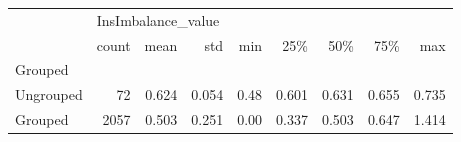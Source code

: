 \begin{tabular}{lrrrrrrrr}
\toprule
{} & \multicolumn{8}{l}{InsImbalance\_value} \\
{} &              count &   mean &    std &   min &    25\% &    50\% &    75\% &    max \\
Grouped   &                    &        &        &       &        &        &        &        \\
\midrule
Ungrouped &                 72 &  0.624 &  0.054 &  0.48 &  0.601 &  0.631 &  0.655 &  0.735 \\
Grouped   &               2057 &  0.503 &  0.251 &  0.00 &  0.337 &  0.503 &  0.647 &  1.414 \\
\bottomrule
\end{tabular}
